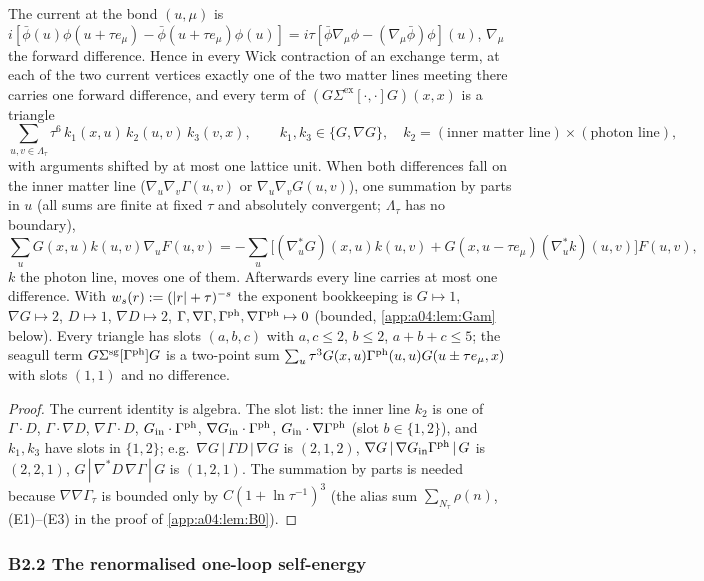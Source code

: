 \begin{lemma}\label{app:a04:lem:D}
The current at the bond $(u,\mu)$ is $i[\bar\phi(u)\phi(u+\tau e_\mu)-\bar\phi(u+\tau e_\mu)\phi(u)]=i\tau[\bar\phi\nabla_\mu\phi-(\nabla_\mu\bar\phi)\phi](u)$, $\nabla_\mu$ the forward difference. Hence in every Wick contraction of an exchange term, at each of the two current vertices exactly one of the two matter lines meeting there carries one forward difference, and every term of $(G\Sigma^{\mathrm{ex}}[\cdot,\cdot]G)(x,x)$ is a triangle
\[
\textstyle\sum_{u,v\in\Lambda_\tau}\tau^6\,k_1(x,u)\,k_2(u,v)\,k_3(v,x),\qquad k_1,k_3\in\{G,\nabla G\},\quad k_2=(\text{inner matter line})\times(\text{photon line}),
\]
with arguments shifted by at most one lattice unit. When both differences fall on the inner matter line ($\nabla_u\nabla_v\Gamma(u,v)$ or $\nabla_u\nabla_vG(u,v)$), one summation by parts in $u$ (all sums are finite at fixed $\tau$ and absolutely convergent; $\Lambda_\tau$ has no boundary),
\[
\textstyle\sum_uG(x,u)k(u,v)\nabla_uF(u,v)=-\sum_u\big[(\nabla^*_uG)(x,u)k(u,v)+G(x,u-\tau e_\mu)(\nabla^*_uk)(u,v)\big]F(u,v),
\]
$k$ the photon line, moves one of them. Afterwards every line carries at most one difference. With $w_s(r):=(|r|+\tau)^{-s}$ the exponent bookkeeping is $G\mapsto1$, $\nabla G\mapsto2$, $D\mapsto1$, $\nabla D\mapsto2$, $\Gamma,\nabla\Gamma,\Gamma^{\mathrm{ph}},\nabla\Gamma^{\mathrm{ph}}\mapsto0$ (bounded, \cref{app:a04:lem:Gam} below). Every triangle has slots $(a,b,c)$ with $a,c\le2$, $b\le2$, $a+b+c\le5$; the seagull term $G\Sigma^{\mathrm{sg}}[\Gamma^{\mathrm{ph}}]G$ is a two-point sum $\sum_u\tau^3G(x,u)\Gamma^{\mathrm{ph}}(u,u)G(u\pm\tau e_\mu,x)$ with slots $(1,1)$ and no difference.
\end{lemma}
\begin{proof}
The current identity is algebra. The slot list: the inner line $k_2$ is one of $\Gamma\cdot D$, $\Gamma\cdot\nabla D$, $\nabla\Gamma\cdot D$, $G_{\mathrm{in}}\cdot\Gamma^{\mathrm{ph}}$, $\nabla G_{\mathrm{in}}\cdot\Gamma^{\mathrm{ph}}$, $G_{\mathrm{in}}\cdot\nabla\Gamma^{\mathrm{ph}}$ (slot $b\in\{1,2\}$), and $k_1,k_3$ have slots in $\{1,2\}$; e.g.\ $\nabla G\,|\,\Gamma D\,|\,\nabla G$ is $(2,1,2)$, $\nabla G\,|\,\nabla G_{\mathrm{in}}\Gamma^{\mathrm{ph}}\,|\,G$ is $(2,2,1)$, $G\,|\,\nabla^*D\,\nabla\Gamma\,|\,G$ is $(1,2,1)$. The summation by parts is needed because $\nabla\nabla\Gamma_\tau$ is bounded only by $C(1+\ln\tau^{-1})^3$ (the alias sum $\sum_{N_\tau}\rho(n)$, (E1)--(E3) in the proof of \cref{app:a04:lem:B0}).
\end{proof}

\subsubsection*{B2.2 The renormalised one-loop self-energy}

